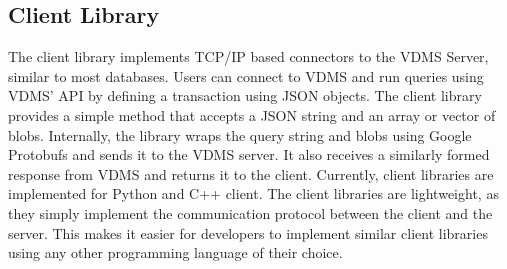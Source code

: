 \subsection{Client Library}

The client library implements TCP/IP based connectors to the VDMS Server,
similar to most databases\cite{memsql, mysql, postgresql}.
Users can connect to VDMS and run queries using VDMS' API
by defining a transaction using JSON objects.
The client library provides a simple method that
accepts a JSON string and an array or vector of blobs.
Internally, the library wraps the query string and blobs using
Google Protobufs \cite{protobufs} and sends it to the VDMS server.
It also receives a similarly formed response from VDMS
and returns it to the client.
Currently, client libraries are implemented for Python and C++ client.
The client libraries are lightweight, as they simply implement the communication
protocol between the client and the server.
This makes it easier for developers to implement similar client libraries using
any other programming language of their choice.
